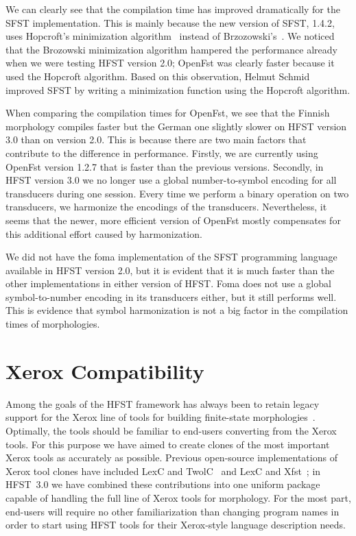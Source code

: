 \documentclass{llncs}
\begin{document}
We can clearly see that the compilation time has improved dramatically
for the SFST implementation.
This is mainly because the new version of SFST, 1.4.2, uses Hopcroft's
minimization algorithm~\cite{hopcroft/1971} instead of 
Brzozowski's~\cite{brzozowski/1964}. 
We noticed that the Brozowski minimization algorithm hampered the performance
already when we were testing HFST version 2.0; 
OpenFst was clearly faster because it used the Hopcroft algorithm. 
Based on this observation, Helmut Schmid improved SFST by 
writing a minimization function using the Hopcroft algorithm.

When comparing the compilation times for OpenFst, we see that the
Finnish morphology compiles faster but the German one slightly slower
on HFST version 3.0 than on version 2.0. This is because there are two
main factors that contribute to the difference in performance. Firstly, we
are currently using OpenFst version 1.2.7 that is faster than the
previous versions. Secondly, in HFST version 3.0 we no longer use a
global number-to-symbol encoding for all transducers during one
session. Every time we perform a binary operation on two transducers,
we harmonize the encodings of the transducers. Nevertheless, 
it seems that the newer, more efficient version of 
OpenFst mostly compensates for this additional effort caused by harmonization. 

We did not have the foma implementation of the SFST programming language 
available in HFST version 2.0, but it is evident that it is much faster than the other
implementations in either version of HFST. Foma does not use
a global symbol-to-number encoding in its transducers either, but it still
performs well. This is evidence that symbol harmonization is not a big
factor in the compilation times of morphologies. 


\section{Xerox Compatibility}\label{hfst:xerox-compatibility}
Among the goals of the HFST framework has always been to retain legacy support
for the Xerox line of tools for building finite-state
morphologies~\cite{beesley/2003}. Optimally, the tools should be familiar
to end-users converting from the Xerox tools. For this purpose we have aimed to
create clones of the most important Xerox tools as accurately as possible.
Previous open-source implementations of Xerox tool clones have included
LexC and TwolC~\cite{linden/2009/sfcm} and LexC and Xfst~\cite{hulden/2009}; in
HFST~3.0 we have combined these contributions into one uniform package capable of
handling the full line of Xerox tools for morphology. For the most part,
end-users will require no other familiarization than changing program names in
order to start using HFST tools for their Xerox-style language description
needs.
\end{document}
